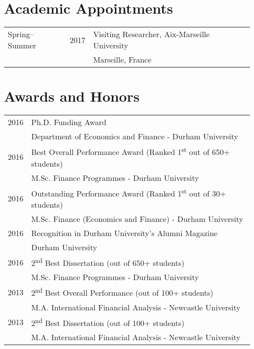 \documentclass[margin,line,pifont,palatino,courier]{res}
\newcommand{\ts}{\textsuperscript}
\begin{document}
\begin{resume}
\hrulefill

\section{\sc \bf Academic Appointments}

\begin{tabular}{@{}p{1.3in}p{0.7in}p{4in}}
Spring--Summer & 2017 &Visiting Researcher, Aix-Marseille University\\
&&Marseille, France
\end{tabular}

\hrulefill

\section{\sc \bf Awards and Honors}

\begin{longtable}{@{}p{0.7in}p{4in}}
2016 & Ph.D. Funding Award \\
           &Department of Economics and Finance - Durham University  \\
\rule{0pt}{4ex}2016 & Best Overall Performance Award (Ranked 1\ts{st} out of 650+ students)  \\
           & M.Sc. Finance Programmes - Durham University  \\
\rule{0pt}{4ex}2016 & Outstanding Performance Award (Ranked 1\ts{st} out of 30+ students)  \\
           & M.Sc. Finance (Economics and Finance) - Durham University  \\
\rule{0pt}{4ex}2016 & Recognition in Durham University's Alumni Magazine\\
           & Durham University\\
\rule{0pt}{4ex}2016 & 2\ts{nd} Best Dissertation (out of 650+ students)\\
           & M.Sc. Finance Programmes - Durham University\\
\rule{0pt}{4ex}2013 & 2\ts{nd} Best Overall Performance (out of 100+ students)\\
           & M.A. International Financial Analysis - Newcastle University\\
\rule{0pt}{4ex}2013 & 2\ts{nd} Best Dissertation (out of 100+ students)\\
           & M.A. International Financial Analysis - Newcastle University
\end{longtable}

\hrulefill


\end{resume}
\end{document}
